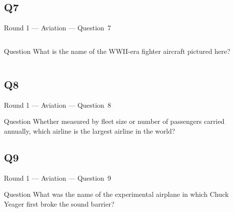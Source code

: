 \documentclass[11pt]{beamer}
\begin{document}
\subsection*{Q7}
\begin{frame}[t]{Round 1 --- Aviation --- \mbox{Question 7}}
\vspace{-0.5em}
\begin{columns}[T,totalwidth=\linewidth]
\begin{column}{0.32\linewidth}
\begin{block}{Question}
What is the name of the WWII-era fighter aircraft pictured here?
\end{block}
\end{column}
\begin{column}{0.65\linewidth}
\begin{center}
\texttt{[image: \{Images/spitfire]}.jpg}
\end{center}
\end{column}
\end{columns}
\end{frame}
\subsection*{Q8}
\begin{frame}[t]{Round 1 --- Aviation --- \mbox{Question 8}}
\vspace{-0.5em}
\begin{block}{Question}
Whether measured by fleet size or number of passengers carried annually, which airline is the largest airline in the world?
\end{block}
\end{frame}
\subsection*{Q9}
\begin{frame}[t]{Round 1 --- Aviation --- \mbox{Question 9}}
\vspace{-0.5em}
\begin{block}{Question}
What was the name of the experimental airplane in which Chuck Yeager first broke the sound barrier?
\end{block}
\end{frame}
\end{document}
